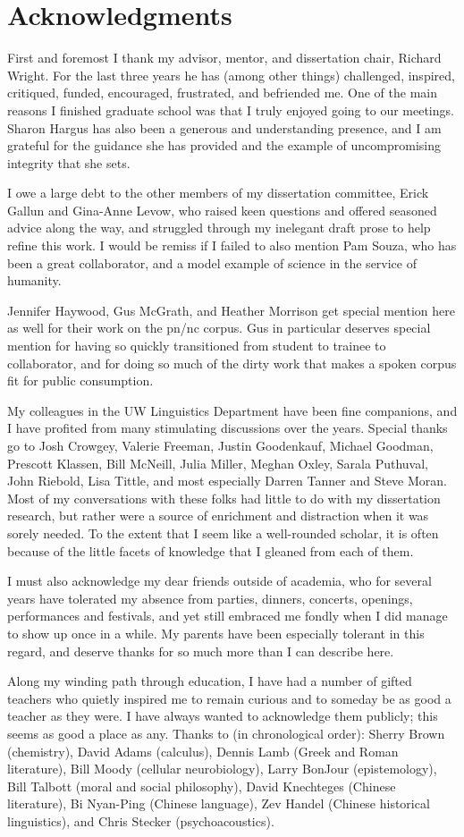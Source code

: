 \chapter*{Acknowledgments}
First and foremost I thank my advisor, mentor, and dissertation chair, Richard Wright.  For the last three years he has (among other things) challenged, inspired, critiqued, funded, encouraged, frustrated, and befriended me.  One of the main reasons I finished graduate school was that I truly enjoyed going to our meetings.  Sharon Hargus has also been a generous and understanding presence, and I am grateful for the guidance she has provided and the example of uncompromising integrity that she sets.

I owe a large debt to the other members of my dissertation committee, Erick Gallun and Gina-Anne Levow, who raised keen questions and offered seasoned advice along the way, and struggled through my inelegant draft prose to help refine this work.  I would be remiss if I failed to also mention Pam Souza, who has been a great collaborator, and a model example of science in the service of humanity.  

Jennifer Haywood, Gus McGrath, and Heather Morrison get special mention here as well for their work on the \ac{pn/nc} corpus.  Gus in particular deserves special mention for having so quickly transitioned from student to trainee to collaborator, and for doing so much of the dirty work that makes a spoken corpus fit for public consumption.

My colleagues in the UW Linguistics Department have been fine companions, and I have profited from many stimulating discussions over the years.  Special thanks go to Josh Crowgey, Valerie Freeman, Justin Goodenkauf, Michael Goodman, Prescott Klassen, Bill McNeill, Julia Miller, Meghan Oxley, Sarala Puthuval, John Riebold, Lisa Tittle, and most especially Darren Tanner and Steve Moran.  Most of my conversations with these folks had little to do with my dissertation research, but rather were a source of enrichment and distraction when it was sorely needed.  To the extent that I seem like a well-rounded scholar, it is often because of the little facets of knowledge that I gleaned from each of them.  

I must also acknowledge my dear friends outside of academia, who for several years have tolerated my absence from parties, dinners, concerts, openings, performances and festivals, and yet still embraced me fondly when I did manage to show up once in a while.  My parents have been especially tolerant in this regard, and deserve thanks for so much more than I can describe here.

Along my winding path through education, I have had a number of gifted teachers who quietly inspired me to remain curious and to someday be as good a teacher as they were.  I have always wanted to acknowledge them publicly; this seems as good a place as any.  Thanks to (in chronological order): Sherry Brown (chemistry), David Adams (calculus), Dennis Lamb (Greek and Roman literature), Bill Moody (cellular neurobiology), Larry BonJour (epistemology), Bill Talbott (moral and social philosophy), David Knechteges (Chinese literature), Bi Nyan-Ping (Chinese language), Zev Handel (Chinese historical linguistics), and Chris Stecker (psychoacoustics).
